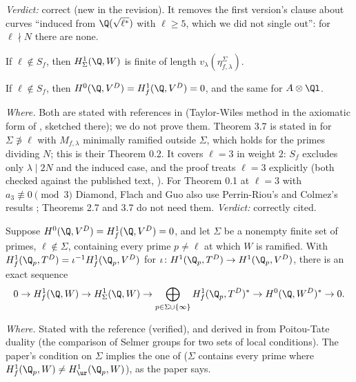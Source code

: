 \begin{sloppypar}
\noindent\emph{Verdict:} correct (new in the revision). It removes the first version's clause about curves ``induced from $\Q(\sqrt{\ell^*})$ with $\ell\ge5$, which we did not single
out'': for $\ell\nmid N$ there are none.

\begin{theorem}\label{thm:paper:dfg37}
If $\ell\notin S_f$, then $H^1_\Sigma(\Q,W)$ is finite of length $v_\lambda(\eta^\Sigma_{f,\lambda})$.
\end{theorem}

\begin{theorem}\label{thm:paper:dfg27}
If $\ell\notin S_f$, then $H^0(\Q,V^D)=H^1_f(\Q,V^D)=0$, and the same for $A\otimes\Ql$.
\end{theorem}

\noindent\emph{Where.} Both are stated with references in  (Taylor-Wiles method in the axiomatic form of \cite{DFG04}, sketched there); we do not prove
them. Theorem 3.7 is stated in \cite{DFG04} for $\Sigma\not\ni\ell$ with $M_{f,\lambda}$ minimally ramified outside $\Sigma$, which holds for the primes dividing $N$; this is their Theorem 0.2. It
covers $\ell=3$ in weight $2$: $S_f$ excludes only $\lambda\mid2N$ and the induced case, and the proof treats $\ell=3$ explicitly (both checked against the published text, ).
For Theorem 0.1 at $\ell=3$ with $a_3\not\equiv0\pmod3$ Diamond, Flach and Guo also use Perrin-Riou's and Colmez's results \cite[Proposition 2.16]{DFG04}; Theorems 2.7 and 3.7 do not need them.
\emph{Verdict:} correctly cited.

\begin{lemma}\label{lem:paper:dfg21}
Suppose $H^0(\Q,V^D)=H^1_f(\Q,V^D)=0$, and let $\Sigma$ be a nonempty finite set of primes, $\ell\notin\Sigma$, containing every prime $p\ne\ell$ at which $W$ is ramified. With
$H^1_f(\Q_p,T^D)=\iota^{-1}H^1_f(\Q_p,V^D)$ for $\iota\colon H^1(\Q_p,T^D)\to H^1(\Q_p,V^D)$, there is an exact sequence
\[
0\to H^1_f(\Q,W)\to H^1_\Sigma(\Q,W)\to\bigoplus_{p\in\Sigma\cup\{\infty\}}H^1_f(\Q_p,T^D)^*\to H^0(\Q,W^D)^*\to0.
\]
\end{lemma}

\noindent\emph{Where.} Stated with the reference \cite[Lemma 2.1]{DFG04} (verified), and derived in  from Poitou-Tate duality (the comparison of
Selmer groups for two sets of local conditions). The paper's condition on $\Sigma$ implies the one of \cite{DFG04} ($\Sigma$ contains every prime where $H^1_f(\Q_p,W)\ne H^1_{\ur}(\Q_p,W)$), as
the paper says.


\end{sloppypar}
